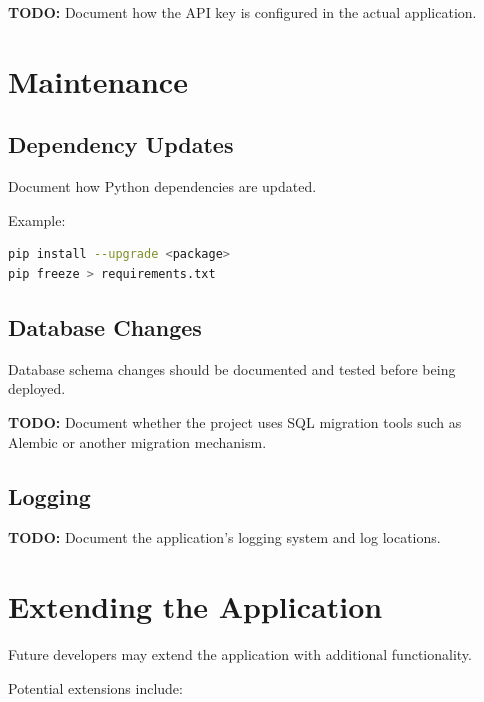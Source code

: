\documentclass[12pt,a4paper]{article}
\begin{document}
\textbf{TODO:} Document how the API key is configured in the
actual application.


\section{Maintenance}

\subsection{Dependency Updates}

Document how Python dependencies are updated.

Example:

\begin{lstlisting}[language=bash]
pip install --upgrade <package>
pip freeze > requirements.txt
\end{lstlisting}

\subsection{Database Changes}

Database schema changes should be documented and tested before
being deployed.

\textbf{TODO:} Document whether the project uses SQL migration tools
such as Alembic or another migration mechanism.

\subsection{Logging}

\textbf{TODO:} Document the application's logging system and
log locations.


\section{Extending the Application}

Future developers may extend the application with additional
functionality.

Potential extensions include:
\end{document}
